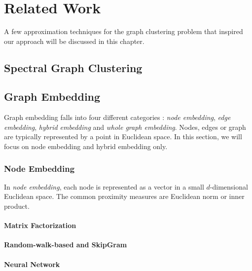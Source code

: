 \chapter{Related Work}

A few approximation techniques for the graph clustering problem that inspired our approach will be discussed in this chapter.

\section{Spectral Graph Clustering}




\newpage
\section{Graph Embedding}

Graph embedding falls into four different categories \cite{cai2018comprehensive}: \emph{node embedding}, \emph{edge embedding}, \emph{hybrid embedding} and \emph{whole graph embedding}. Nodes, edges or graph are typically represented by a point in Euclidean space. In this section, we will focus on node embedding and hybrid embedding only.

\subsection{Node Embedding}

In \emph{node embedding}, each node is represented as a vector in a small $d$-dimensional Euclidean space. The common proximity measures are Euclidean norm or inner product.


\subsubsection{Matrix Factorization}



\newpage
\subsubsection{Random-walk-based and SkipGram}




\newpage
\subsubsection{Neural Network}

